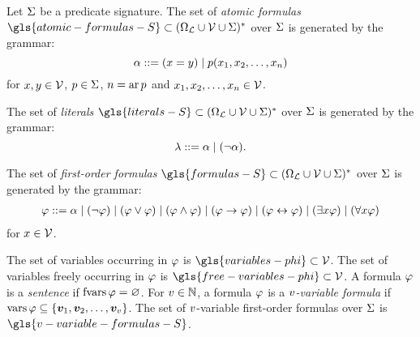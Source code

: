 
Let $\mathrm{\Sigma}$ be a predicate signature.
The set of \emph{atomic formulas} $\gls{atomic-formulas-S} \subset
\Words{(\SymbAlph \cup \VarSymbs \cup \SigS)}$ over $\mathrm{\Sigma}$ is generated by the
grammar:
\[
  \alpha ::= (x = y) \mid p(x_{1}, x_{2}, \dots, x_{n})
\]
for $x,y \in \mathcal{V}$, $p \in \mathrm{\Sigma}$, $n = \operatorname{ar}p$ and
$x_{1}, x_{2}, \dots, x_{n} \in \mathcal{V}$.

The set of \emph{literals} 
$\gls{literals-S} \subset \Words{(\SymbAlph \cup \VarSymbs \cup \SigS)}$ over
$\mathrm{\Sigma}$ is generated by the grammar:
\[
  \lambda ::= \alpha \mid (\lnot\alpha).
\]

The set of \emph{first-order formulas}
$\gls{formulas-S} \subset \Words{(\SymbAlph \cup \VarSymbs \cup
\SigS)}$ over $\mathrm{\Sigma}$ is generated by the grammar:
\begin{align*}
  \varphi ::= \alpha \mid (\lnot\varphi) \mid (\varphi \lor \varphi)
  \mid (\varphi \land \varphi) \mid (\varphi \rightarrow \varphi) 
  \mid (\varphi \leftrightarrow \varphi) 
  \mid (\exists x\varphi) \mid (\forall x\varphi)
\end{align*}
for $x \in \mathcal{V}$.

The set of variables occurring in $\varphi$ is $\gls{variables-phi} \subset
\VarSymbs$.
The set of variables freely occurring in $\varphi$ is $\gls{free-variables-phi}
\subset \VarSymbs$. A formula $\varphi$ is a \emph{sentence} if $\operatorname{fvars}\varphi =
\varnothing$. For $v \in \mathbb{N}$, a formula $\varphi$ is a \emph{$v$-variable
formula} if $\operatorname{vars}\varphi \subseteq \left\{\bm{v}_{1},\bm{v}_{2},\dots,\bm{v}_{v}\right\}$.
The set of $v$-variable first-order formulas over $\mathrm{\Sigma}$ is
$\gls{v-variable-formulas-S}$.